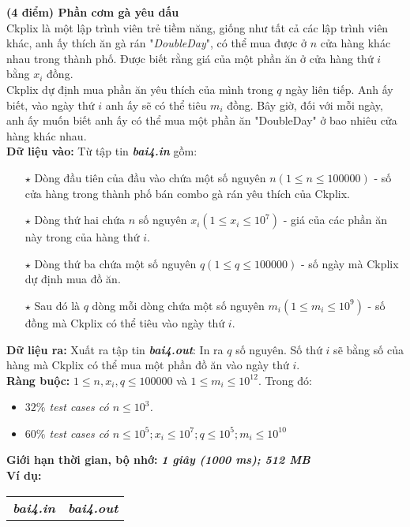 \begin{ex}
	\textbf{(4 điểm) Phần cơm gà yêu dấu}\\
	Ckplix là một lập trình viên trẻ tiềm năng, giống như tất cả các lập trình viên khác, anh ấy thích ăn gà rán "\textit{DoubleDay}", có thể mua được ở $n$ cửa hàng khác nhau trong thành phố. Được biết rằng giá của một phần ăn ở cửa hàng thứ $i$ bằng $x_i$ đồng.\\
	Ckplix dự định mua phần ăn yêu thích của mình trong $q$ ngày liên tiếp. Anh ấy biết, vào ngày thứ $i$ anh ấy sẽ có thể tiêu $m_i$ đồng. Bây giờ, đối với mỗi ngày, anh ấy muốn biết anh ấy có thể mua một phần ăn "DoubleDay" ở bao nhiêu cửa hàng khác nhau.\\
	\textbf{Dữ liệu vào: } Từ tập tin \textbf{\textit{bai4.in}} gồm: 
	\begin{itemize}
		\item[$\star$] Dòng đầu tiên của đầu vào chứa một số nguyên $n (1 \leq n \leq 100000)$ - số cửa hàng trong thành phố bán combo gà rán yêu thích của Ckplix.
		\item[$\star$] Dòng thứ hai chứa $n$ số nguyên $x_i (1 \leq x_i \leq 10^7)$ - giá của các phần ăn này trong của hàng thứ $i$. 
		\item[$\star$] Dòng thứ ba chứa một số nguyên $q (1 \leq q \leq 100 000)$ - số ngày mà Ckplix dự định mua đồ ăn. 
		\item[$\star$] Sau đó là $q$ dòng mỗi dòng chứa một số nguyên $m_i (1 \leq m_i \leq 10^9)$ - số đồng mà Ckplix có thể tiêu vào ngày thứ $i$. 
	\end{itemize}
	\textbf{Dữ liệu ra: } Xuất ra tập tin \textbf{\textit{bai4.out}}: In ra $q$ số nguyên. Số thứ $i$ sẽ bằng số của hàng mà Ckplix có thể mua một phần đồ ăn vào ngày thứ $i$. \\
	\textbf{Ràng buộc: } $1 \leq n, x_i, q \leq 100000$ và $1 \leq m_i \leq 10^{12}$. Trong đó: 
	\begin{itemize}
		\item \textit{$32\%$ test cases có $n \leq 10^3$.}
		\item \textit{$60\%$ test cases có $n \leq 10^5; x_i \leq 10^7; q \leq 10^5; m_i \leq 10^{10} $}
	\end{itemize}
	\textbf{Giới hạn thời gian, bộ nhớ: } \textbf{\textit{1 giây (1000 ms); 512 MB}} \\
	\textbf{Ví dụ: }
	\begin{center}
		\begin{tabular}{|l|l|}
			\hline
			\textbf{\textsf{\textit{bai4.in}}} & \textbf{\textsf{\textit{bai4.out}}} \\ %

\end{tabular}
\end{center}
\end{ex}
